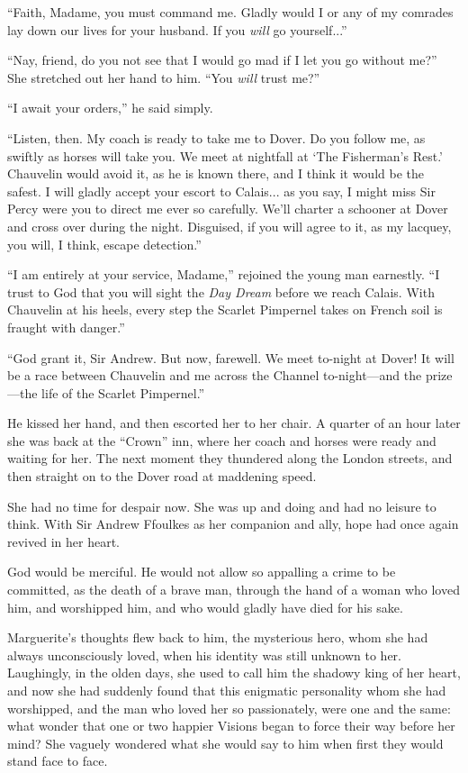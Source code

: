 \documentclass[paper=a5,BCOR=7mm,twoside,DIV=calc,12pt,usegeometry,chapterprefix,endperiod,headings=big]{scrbook}
\begin{document}
\enquote{Faith, Madame, you must command me. Gladly would I or any of my comrades lay down our lives for your husband. If you \textit{will} go yourself...}

\enquote{Nay, friend, do you not see that I would go mad if I let you go without me?} She stretched out her hand to him. \enquote{You \textit{will} trust me?}

\enquote{I await your orders,} he said simply.

\enquote{Listen, then. My coach is ready to take me to Dover. Do you follow me, as swiftly as horses will take you. We meet at nightfall at \enquote{The Fisherman's Rest.} Chauvelin would avoid it, as he is known there, and I think it would be the safest. I will gladly accept your escort to Calais... as you say, I might miss Sir Percy were you to direct me ever so carefully. We'll charter a schooner at Dover and cross over during the night. Disguised, if you will agree to it, as my lacquey, you will, I think, escape detection.}

\enquote{I am entirely at your service, Madame,} rejoined the young man earnestly. \enquote{I trust to God that you will sight the \textit{Day Dream} before we reach Calais. With Chauvelin at his heels, every step the Scarlet Pimpernel takes on French soil is fraught with danger.}

\enquote{God grant it, Sir Andrew. But now, farewell. We meet to-night at Dover! It will be a race between Chauvelin and me across the Channel to-night---and the prize---the life of the Scarlet Pimpernel.}

He kissed her hand, and then escorted her to her chair. A quarter of an hour later she was back at the \enquote{Crown} inn, where her coach and horses were ready and waiting for her. The next moment they thundered along the London streets, and then straight on to the Dover road at maddening speed.

She had no time for despair now. She was up and doing and had no leisure to think. With Sir Andrew Ffoulkes as her companion and ally, hope had once again revived in her heart.

God would be merciful. He would not allow so appalling a crime to be committed, as the death of a brave man, through the hand of a woman who loved him, and worshipped him, and who would gladly have died for his sake.

Marguerite's thoughts flew back to him, the mysterious hero, whom she had always unconsciously loved, when his identity was still unknown to her. Laughingly, in the olden days, she used to call him the shadowy king of her heart, and now she had suddenly found that this enigmatic personality whom she had worshipped, and the man who loved her so passionately, were one and the same: what wonder that one or two happier Visions began to force their way before her mind? She vaguely wondered what she would say to him when first they would stand face to face.
\end{document}

